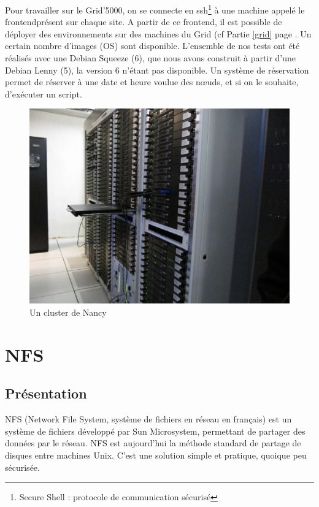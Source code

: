 \documentclass[12pt]{report}
\begin{document}
		Pour travailler sur le Grid'5000, on se connecte en ssh\footnote{Secure Shell : protocole de communication sécurisé} à une machine appelé le \og frontend\fg présent sur chaque site.
		A partir de ce frontend, il est possible de déployer des environnements sur des machines du Grid (cf Partie \ref{grid} page \pageref{grid}.
		Un certain nombre d'images (OS) sont disponible. L'ensemble de nos tests ont été réalisés avec une Debian Squeeze (6),
		que nous avons construit à partir d'une Debian Lenny (5), la version 6 n'étant pas disponible.
		Un système de réservation permet de réserver à une date et heure voulue des nœuds, et si on le souhaite,
		d'exécuter un script.

		\begin{figure}[H]
			\begin{center}
				\includegraphics[width=0.6\linewidth]{images/cluster_nancy.jpg}
				\caption{Un cluster de Nancy}
			\end{center}
		\end{figure}
		


	\chapter{NFS}
		\section{Présentation}

NFS (Network File System, système de fichiers en réseau en français) est un système de fichiers développé par Sun Microsystem, permettant de partager des données par le réseau. NFS est aujourd’hui la méthode standard de partage de disques entre machines Unix. 
		C’est une solution simple et pratique, quoique peu sécurisée.\\
		
\end{document}
